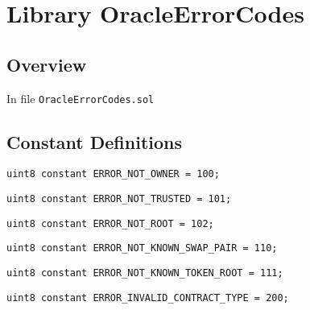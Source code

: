 
\chapter{Library OracleErrorCodes}

\minitoc

\section{Overview}


In file {\tt OracleErrorCodes.sol}

\section{Constant Definitions}


\begin{lstlisting}[firstnumber=4]
    uint8 constant ERROR_NOT_OWNER = 100;
\end{lstlisting}

\begin{lstlisting}[firstnumber=5]
    uint8 constant ERROR_NOT_TRUSTED = 101;
\end{lstlisting}

\begin{lstlisting}[firstnumber=6]
    uint8 constant ERROR_NOT_ROOT = 102;
\end{lstlisting}

\begin{lstlisting}[firstnumber=8]
    uint8 constant ERROR_NOT_KNOWN_SWAP_PAIR = 110;
\end{lstlisting}

\begin{lstlisting}[firstnumber=9]
    uint8 constant ERROR_NOT_KNOWN_TOKEN_ROOT = 111;
\end{lstlisting}

\begin{lstlisting}[firstnumber=11]
    uint8 constant ERROR_INVALID_CONTRACT_TYPE = 200;
\end{lstlisting}
